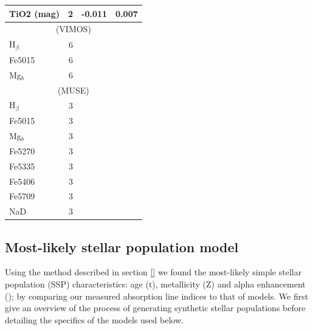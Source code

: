 \begin{table}
\begin{tabular}{l r r r}
			TiO2 (mag)	& 2 		& -0.011	& 0.007	\\
			\hline
			\multicolumn{4}{c}{\citet{Ogando2008} (VIMOS)} \\
			\hline
			H$_\beta$ 	& 6 		& 		& 	\\
			Fe5015 		& 6 		& 		& 	\\
			Mg$_b$ 		& 6 		& 		& 	\\
			\hline
			\multicolumn{4}{c}{\citet{Ogando2008} (MUSE)} \\
			\hline
			H$_\beta$ 	& 3 		& 		& 	\\ 
			Fe5015 		& 3 		& 		& 	\\ 
			Mg$_b$ 		& 3 		& 		& 	\\
			Fe5270 		& 3 		& 		& 	\\
			Fe5335 		& 3 		& 		& 	\\
			Fe5406 		& 3 		& 		& 	\\
			Fe5709 		& 3 		& 		& 	\\
			NaD 		& 3 		& 		& 	\\
			\hline
		\end{tabular}
	\end{table}



	\subsection{Most-likely stellar population model}
		\label{subsec:ssp}
		Using the method described in section \ref{} we found the most-likely simple stellar population (SSP) characteristics: age (t), metallicity (Z) and alpha enhancement (\textalpha); by comparing our measured absorption line indices to that of models. We first give an overview of the process of generating synthetic stellar populations before detailing the specifics of the models used below. 

